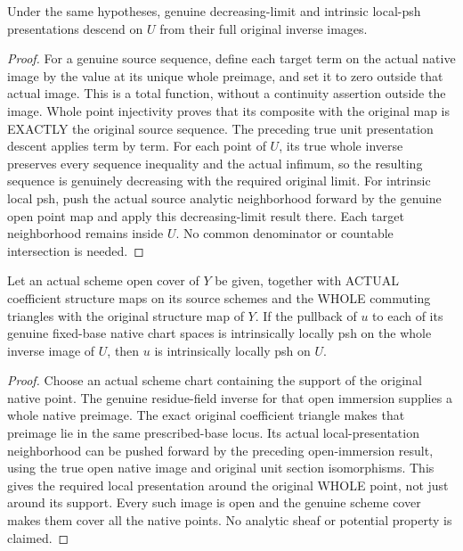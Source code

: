 \begin{lemma}
\label{scheme:native-local-psh-open-immersion-descent}
\leanok
{}
Under the same hypotheses, genuine decreasing-limit and intrinsic local-psh
presentations descend on $U$ from their full original inverse images.
\end{lemma}
\begin{proof}
For a genuine source sequence, define each target term on the actual native
image by the value at its unique whole preimage, and set it to zero outside
that actual image. This is a total function, without a continuity assertion
outside the image. Whole point injectivity proves that its composite with the
original map is EXACTLY the original source sequence. The preceding true unit
presentation descent applies term by term. For each point of $U$, its true
whole inverse preserves every sequence inequality and the actual infimum, so
the resulting sequence is genuinely decreasing with the required original
limit. For intrinsic local psh, push the actual source analytic neighborhood
forward by the genuine open point map and apply this decreasing-limit result
there. Each target neighborhood remains inside $U$. No common denominator or
countable intersection is needed.
\end{proof}

\begin{theorem}
\label{scheme:native-local-psh-scheme-cover}
\leanok
{}
Let an actual scheme open cover of $Y$ be given, together with ACTUAL
coefficient structure maps on its source schemes and the WHOLE commuting
triangles with the original structure map of $Y$. If the pullback of $u$ to each
of its genuine fixed-base native chart spaces is intrinsically locally psh on
the whole inverse image of $U$, then $u$ is intrinsically locally psh on $U$.
\end{theorem}
\begin{proof}
Choose an actual scheme chart containing the support of the original native
point. The genuine residue-field inverse for that open immersion supplies a
whole native preimage. The exact original coefficient triangle makes that
preimage lie in the same prescribed-base locus. Its actual local-presentation
neighborhood can be pushed forward by the preceding open-immersion result,
using the true open native image and original unit section isomorphisms.
This gives the required local presentation around the original WHOLE point,
not just around its support. Every such image is open and the genuine scheme
cover makes them cover all the native points. No analytic sheaf or potential
property is claimed.
\end{proof}
